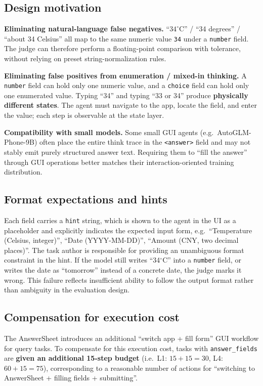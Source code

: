 \documentclass{llmxive}
\begin{document}
\subsection{Design motivation}

\textbf{Eliminating natural-language false negatives.} ``$34^\circ$C'' / ``34 degrees'' / ``about 34 Celsius'' all map to the same numeric value \texttt{34} under a \texttt{number} field. The judge can therefore perform a floating-point comparison with tolerance, without relying on preset string-normalization rules.

\textbf{Eliminating false positives from enumeration / mixed-in thinking.} A \texttt{number} field can hold only one numeric value, and a \texttt{choice} field can hold only one enumerated value. Typing ``34'' and typing ``33 or 34'' produce \textbf{physically different states}. The agent must navigate to the app, locate the field, and enter the value; each step is observable at the state layer.

\textbf{Compatibility with small models.} Some small GUI agents (e.g.\ AutoGLM-Phone-9B) often place the entire think trace in the \texttt{<answer>} field and may not stably emit purely structured answer text. Requiring them to ``fill the answer'' through GUI operations better matches their interaction-oriented training distribution.

\subsection{Format expectations and hints}

Each field carries a \texttt{hint} string, which is shown to the agent in the UI as a placeholder and explicitly indicates the expected input form, e.g.\ ``Temperature (Celsius, integer)'', ``Date (YYYY-MM-DD)'', ``Amount (CNY, two decimal places)''. The task author is responsible for providing an unambiguous format constraint in the hint. If the model still writes ``34$^\circ$C'' into a \texttt{number} field, or writes the date as ``tomorrow'' instead of a concrete date, the judge marks it wrong. This failure reflects insufficient ability to follow the output format rather than ambiguity in the evaluation design.

\subsection{Compensation for execution cost}

The AnswerSheet introduces an additional ``switch app + fill form'' GUI workflow for query tasks. To compensate for this execution cost, tasks with \texttt{answer\_fields} are \textbf{given an additional 15-step budget} (i.e.\ L1: $15+15=30$, L4: $60+15=75$), corresponding to a reasonable number of actions for ``switching to AnswerSheet + filling fields + submitting''.
\end{document}
